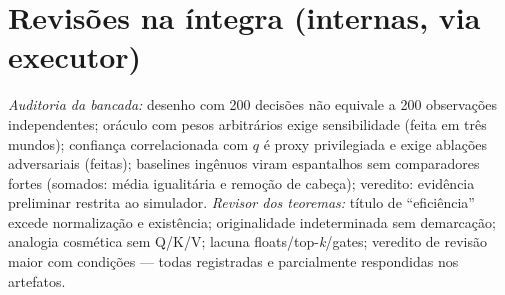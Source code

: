 \section{Revisões na íntegra (internas, via executor)}
\textit{Auditoria da bancada:} desenho com 200 decisões não equivale a 200 observações independentes; oráculo com pesos arbitrários exige sensibilidade (feita em três mundos); confiança correlacionada com $q$ é proxy privilegiada e exige ablações adversariais (feitas); baselines ingênuos viram espantalhos sem comparadores fortes (somados: média igualitária e remoção de cabeça); veredito: evidência preliminar restrita ao simulador. \textit{Revisor dos teoremas:} título de ``eficiência'' excede normalização e existência; originalidade indeterminada sem demarcação; analogia cosmética sem Q/K/V; lacuna floats/top-\textit{k}/gates; veredito de revisão maior com condições --- todas registradas e parcialmente respondidas nos artefatos.
